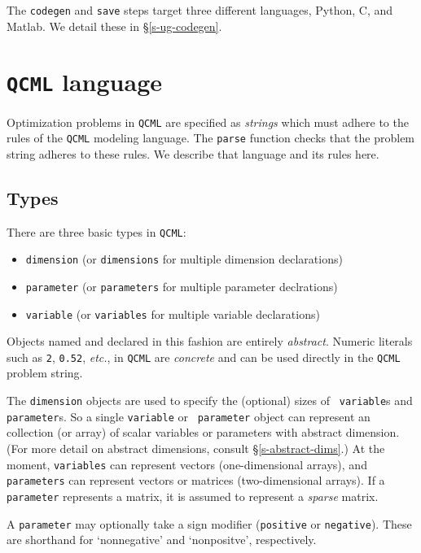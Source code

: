 \documentclass[11pt]{article}
\def\qcml{\texttt{QCML}\xspace}
\newcommand{\etc}{{\it etc.}}
\begin{document}
The {\tt codegen} and {\tt save} steps target three different languages, 
Python, C, and Matlab. We detail these in \S\ref{s-ug-codegen}.

\section{\qcml language}
\label{s-ug-language}
Optimization problems in \qcml are specified as \emph{strings} which must adhere to 
the rules of the \qcml modeling language. The {\tt parse} function checks that
the problem string adheres to these rules. We describe that language and its
rules here.

\subsection{Types}
There are three basic types in \qcml:
\begin{itemize}
\item {\tt dimension} (or {\tt dimensions} for multiple dimension declarations)
\item {\tt parameter} (or {\tt parameters} for multiple parameter declrations)
\item {\tt variable} (or {\tt variables} for multiple variable declarations)
\end{itemize}
Objects named and declared in this fashion are entirely \emph{abstract}.
Numeric literals such as {\tt 2}, {\tt 0.52}, \etc, in \qcml are
\emph{concrete} and can be used directly in the \qcml problem string. 

The {\tt dimension} objects are used to specify the (optional) sizes of {\tt
variable}s and {\tt parameter}s. So a single {\tt variable} or {\tt
parameter} object can represent an collection (or array) of scalar variables
or parameters with abstract dimension. (For more detail on abstract
dimensions, consult \S\ref{s-abstract-dims}.) At the moment, {\tt variables}
can represent vectors (one-dimensional arrays), and {\tt parameters} can
represent vectors or matrices (two-dimensional arrays). If a {\tt parameter}
represents a matrix, it is assumed to represent a \emph{sparse} matrix.

A {\tt parameter} may optionally take a sign modifier ({\tt positive} or 
{\tt negative}). These are shorthand for `nonnegative' and `nonpositve', 
respectively.
\end{document}
